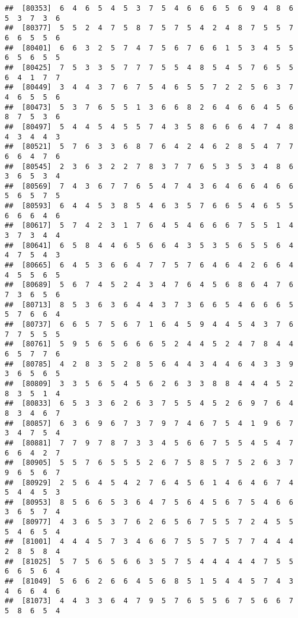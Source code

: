 \documentclass[
]{book}
\begin{document}
\begin{verbatim}
##  [80353]  6  4  6  5  4  5  3  7  5  4  6  6  6  5  6  9  4  8  6  5  3  7  3  6
##  [80377]  5  5  2  4  7  5  8  7  5  7  5  4  2  4  8  7  5  5  7  6  6  5  5  6
##  [80401]  6  6  3  2  5  7  4  7  5  6  7  6  6  1  5  3  4  5  5  6  5  6  5  5
##  [80425]  7  5  3  3  5  7  7  7  5  5  4  8  5  4  5  7  6  5  5  6  4  1  7  7
##  [80449]  3  4  4  3  7  6  7  5  4  6  5  5  7  2  2  5  6  3  7  4  6  5  5  6
##  [80473]  5  3  7  6  5  5  1  3  6  6  8  2  6  4  6  6  4  5  6  8  7  5  3  6
##  [80497]  5  4  4  5  4  5  5  7  4  3  5  8  6  6  6  4  7  4  8  4  3  4  4  3
##  [80521]  5  7  6  3  3  6  8  7  6  4  2  4  6  2  8  5  4  7  7  6  6  4  7  6
##  [80545]  2  3  6  3  2  2  7  8  3  7  7  6  5  3  5  3  4  8  6  3  6  5  3  4
##  [80569]  7  4  3  6  7  7  6  5  4  7  4  3  6  4  6  6  4  6  6  5  6  5  7  5
##  [80593]  6  4  4  5  3  8  5  4  6  3  5  7  6  6  5  4  6  5  5  6  6  6  4  6
##  [80617]  5  7  4  2  3  1  7  6  4  5  4  6  6  6  7  5  5  1  4  3  7  3  4  4
##  [80641]  6  5  8  4  4  6  5  6  6  4  3  5  3  5  6  5  5  6  4  4  7  5  4  3
##  [80665]  6  4  5  3  6  6  4  7  7  5  7  6  4  6  4  2  6  6  4  4  5  5  6  5
##  [80689]  5  6  7  4  5  2  4  3  4  7  6  4  5  6  8  6  4  7  6  7  3  6  5  6
##  [80713]  8  5  3  6  3  6  4  4  3  7  3  6  6  5  4  6  6  6  5  5  7  6  6  4
##  [80737]  6  6  5  7  5  6  7  1  6  4  5  9  4  4  5  4  3  7  6  7  7  5  5  5
##  [80761]  5  9  5  6  5  6  6  6  5  2  4  4  5  2  4  7  8  4  4  6  5  7  7  6
##  [80785]  4  2  8  3  5  2  8  5  6  4  4  3  4  4  6  4  3  3  9  3  6  5  6  5
##  [80809]  3  3  5  6  5  4  5  6  2  6  3  3  8  8  4  4  4  5  2  8  3  5  1  4
##  [80833]  6  5  3  3  6  2  6  3  7  5  5  4  5  2  6  9  7  6  4  8  3  4  6  7
##  [80857]  6  3  6  9  6  7  3  7  9  7  4  6  7  5  4  1  9  6  7  3  4  7  5  4
##  [80881]  7  7  9  7  8  7  3  3  4  5  6  6  7  5  5  4  5  4  7  6  6  4  2  7
##  [80905]  5  5  7  6  5  5  5  2  6  7  5  8  5  7  5  2  6  3  7  9  6  5  6  7
##  [80929]  2  5  6  4  5  4  2  7  6  4  5  6  1  4  6  4  6  7  4  5  4  4  5  3
##  [80953]  8  5  6  6  5  3  6  4  7  5  6  4  5  6  7  5  4  6  6  3  6  5  7  4
##  [80977]  4  3  6  5  3  7  6  2  6  5  6  7  5  5  7  2  4  5  5  5  4  6  5  4
##  [81001]  4  4  4  5  7  3  4  6  6  7  5  5  7  5  7  7  4  4  4  2  8  5  8  4
##  [81025]  5  7  5  6  5  6  6  3  5  7  5  4  4  4  4  4  7  5  5  6  6  5  6  4
##  [81049]  5  6  6  2  6  6  4  5  6  8  5  1  5  4  4  5  7  4  3  4  6  6  4  6
##  [81073]  4  4  3  3  6  4  7  9  5  7  6  5  5  6  7  5  6  6  7  5  8  6  5  4

\end{verbatim}
\end{document}
